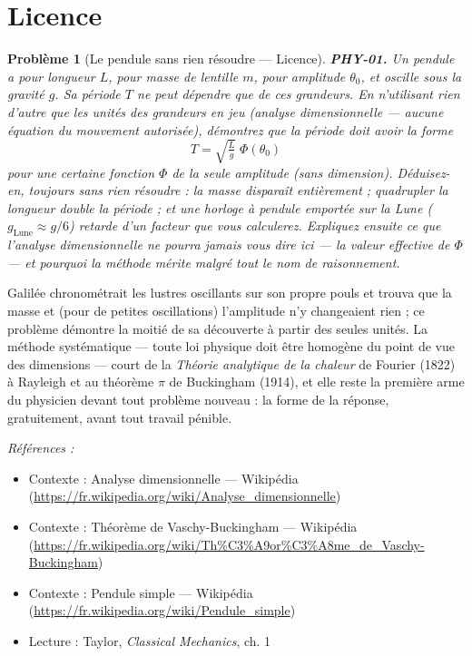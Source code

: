 \documentclass[11pt]{article}
\newtheorem{problem}{Problème}
\newenvironment{refs}{\par\small\noindent\emph{Références :}\begin{itemize}\setlength\itemsep{0pt}}{\end{itemize}\normalsize}
\begin{document}
\bigskip


\section*{Licence}

\begin{problem}[{Le pendule sans rien résoudre --- Licence}]
\textbf{PHY-01.} Un pendule a pour longueur $L$, pour masse de lentille
$m$, pour amplitude $\theta_0$, et oscille sous la gravité $g$. Sa période $T$ ne peut
dépendre que de ces grandeurs. En n'utilisant rien d'autre que les unités des grandeurs en jeu
(analyse dimensionnelle --- aucune équation du mouvement autorisée), démontrez que la période doit
avoir la forme
\[ T = \sqrt{\tfrac{L}{g}}\;\Phi(\theta_0) \]
pour une certaine fonction $\Phi$ de la seule amplitude (sans dimension). Déduisez-en, toujours
sans rien résoudre : la masse disparaît entièrement ; quadrupler la longueur double la période ;
et une horloge à pendule emportée sur la Lune ($g_{\text{Lune}} \approx g/6$) retarde d'un
facteur que vous calculerez. Expliquez ensuite ce que l'analyse dimensionnelle ne pourra jamais
vous dire ici --- la valeur effective de $\Phi$ --- et pourquoi la méthode mérite malgré tout le nom
de raisonnement.
\end{problem}

\noindent Galilée chronométrait les lustres oscillants sur son propre pouls et trouva
que la masse et (pour de petites oscillations) l'amplitude n'y changeaient rien ; ce problème
démontre la moitié de sa découverte à partir des seules unités. La méthode systématique --- toute
loi physique doit être homogène du point de vue des dimensions --- court de la \textit{Théorie analytique
de la chaleur} de Fourier (1822) à Rayleigh et au théorème $\pi$ de Buckingham (1914), et elle
reste la première arme du physicien devant tout problème nouveau : la forme de la réponse,
gratuitement, avant tout travail pénible.

\begin{refs}
\item Contexte : Analyse dimensionnelle --- Wikipédia (\url{https://fr.wikipedia.org/wiki/Analyse_dimensionnelle})
\item Contexte : Théorème de Vaschy-Buckingham --- Wikipédia (\url{https://fr.wikipedia.org/wiki/Th%C3%A9or%C3%A8me_de_Vaschy-Buckingham})
\item Contexte : Pendule simple --- Wikipédia (\url{https://fr.wikipedia.org/wiki/Pendule_simple})
\item Lecture : Taylor, \textit{Classical Mechanics}, ch. 1
\end{refs}
\end{document}

